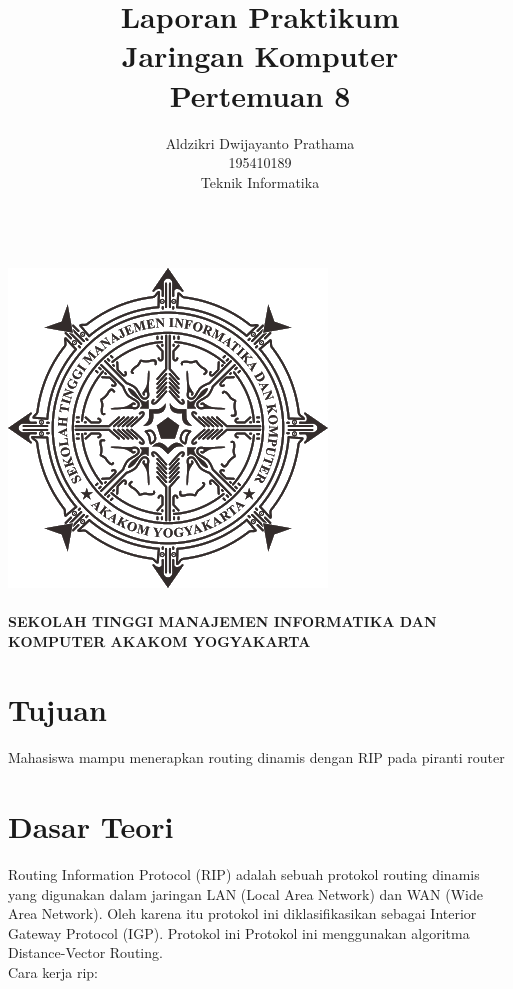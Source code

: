 \documentclass[a4paper,12pt]{article}
\begin{document}
\title{ {\Large Laporan Praktikum}\\ Jaringan Komputer \\{\Large Pertemuan 8}}

\author{Aldzikri Dwijayanto Prathama 
	\\195410189
	\\Teknik Informatika}
\makeatletter
\begin{titlepage}
	\begin{center}
		{\huge \bfseries \@title }\\[14ex]
		\includegraphics[scale=.8]{logo}\\[4ex]
		{\large \@author}\\[19ex]
		{\large \bfseries {SEKOLAH TINGGI MANAJEMEN INFORMATIKA DAN KOMPUTER
				AKAKOM YOGYAKARTA}}
	\end{center}


\end{titlepage}
\makeatother
\newpage
\tableofcontents
\newpage

\section{Tujuan}
Mahasiswa mampu menerapkan routing dinamis dengan RIP pada piranti router

\section{Dasar Teori}
Routing Information Protocol (RIP) adalah sebuah protokol routing dinamis yang digunakan
dalam jaringan LAN (Local Area Network) dan WAN (Wide Area Network). Oleh karena itu protokol ini diklasifikasikan sebagai Interior Gateway
Protocol (IGP). Protokol ini Protokol ini menggunakan algoritma Distance-Vector Routing.
\\
Cara kerja rip:\\
\end{document}
